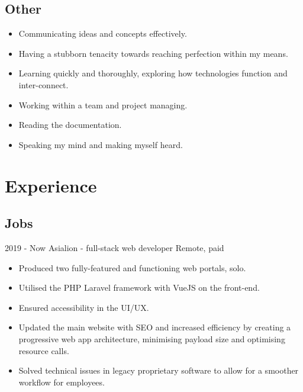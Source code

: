 \documentclass[]{jvcv}
\begin{document}
\vspace{0.1cm}
\subsection{Other}

\begin{minipage}[t]{0.5\textwidth}
	\begin{itemize}
		\item Communicating ideas and concepts effectively.
		\item Having a stubborn tenacity towards reaching perfection within my means.
		\item Learning quickly and thoroughly, exploring how technologies function and inter-connect.
	\end{itemize}
\end{minipage}
\begin{minipage}[t]{0.5\textwidth}
	\begin{itemize}
		\item Working within a team and project managing.
		\item Reading the documentation.
		\item Speaking my mind and making myself heard.
	\end{itemize}
\end{minipage}

%
\vspace{0.5cm}
\section{Experience}

\subsection{Jobs}
\vspace{0.05cm}

\begin{jobslist}
	\jobentry
		{2019 - Now}
		{Asialion - full-stack web developer}
		{Remote, paid}
		{\begin{itemize}
			\item Produced two fully-featured and functioning web portals, solo.
			\item Utilised the PHP Laravel framework with VueJS on the front-end.
			\item Ensured accessibility in the UI/UX.
			\item Updated the main website with SEO and increased efficiency by creating a progressive web app architecture, minimising payload size and optimising resource calls.
			\item Solved technical issues in legacy proprietary software to allow for a smoother workflow for employees.
		\end{itemize}}
\end{jobslist}
\end{document}
